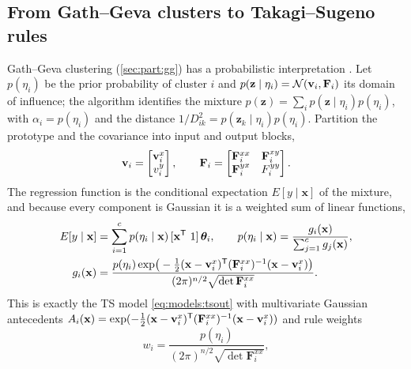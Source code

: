 \subsection{From Gath--Geva clusters to Takagi--Sugeno rules}\label{sec:models:ggts}

Gath--Geva clustering (\cref{sec:part:gg}) has a probabilistic interpretation \cite{gath:1989,abonyi:2002:mgg}. Let $p(\eta_i)$ be the prior probability of cluster $i$ and $p(\mathbf{z}\mid\eta_i)=\mathcal N(\mathbf{v}_i,\mathbf{F}_i)$ its domain of influence; the algorithm identifies the mixture $p(\mathbf{z})=\sum_i p(\mathbf{z}\mid\eta_i)p(\eta_i)$, with $\alpha_i=p(\eta_i)$ and the distance $1/D^2_{ik}=p(\mathbf{z}_k\mid\eta_i)p(\eta_i)$. Partition the prototype and the covariance into input and output blocks,
\begin{equation}
  \mathbf{v}_i=\begin{bmatrix}\mathbf{v}^x_i\\ v^y_i\end{bmatrix},\qquad
  \mathbf{F}_i=\begin{bmatrix}\mathbf{F}^{xx}_i & \mathbf{F}^{xy}_i\\ \mathbf{F}^{yx}_i & F^{yy}_i\end{bmatrix}.
  \label{eq:models:partitionF}
\end{equation}
The regression function is the conditional expectation $E[y\mid\mathbf{x}]$ of the mixture, and because every component is Gaussian it is a weighted sum of linear functions,
\begin{equation}
  \begin{aligned}
  E[y\mid\mathbf{x}]&=\sum_{i=1}^{c}p(\eta_i\mid\mathbf{x})\,[\mathbf{x}\T\ 1]\,\boldsymbol\theta_i,\qquad
  p(\eta_i\mid\mathbf{x})=\frac{g_i(\mathbf{x})}{\sum_{j=1}^{c}g_j(\mathbf{x})},\\
  g_i(\mathbf{x})&=\frac{p(\eta_i)\exp\!\big(-\tfrac12(\mathbf{x}-\mathbf{v}^x_i)\T(\mathbf{F}^{xx}_i)^{-1}(\mathbf{x}-\mathbf{v}^x_i)\big)}{(2\pi)^{n/2}\sqrt{\det\mathbf{F}^{xx}_i}}.
  \end{aligned}
  \label{eq:models:ggposterior}
\end{equation}
This is exactly the TS model \eqref{eq:models:tsout} with multivariate Gaussian antecedents $A_i(\mathbf{x})=\exp(-\tfrac12(\mathbf{x}-\mathbf{v}^x_i)^{\mathsf{T}}(\mathbf{F}^{xx}_i)^{-1}(\mathbf{x}-\mathbf{v}^x_i))$ and rule weights
\begin{equation}
  w_i=\frac{p(\eta_i)}{(2\pi)^{n/2}\sqrt{\det\mathbf{F}^{xx}_i}},
  \label{eq:models:ggweights}
\end{equation}
